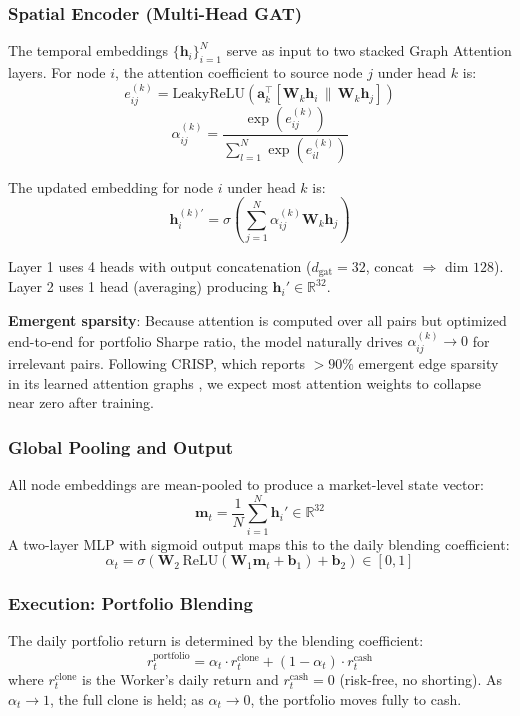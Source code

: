 \documentclass[conferences]{IEEEtran}
\begin{document}
\subsubsection{Spatial Encoder (Multi-Head GAT)}
The temporal embeddings $\{\mathbf{h}_i\}_{i=1}^{N}$ serve as input to two stacked Graph Attention layers. For node $i$, the attention coefficient to source node $j$ under head $k$ is:
\[
    e_{ij}^{(k)} = \text{LeakyReLU}\!\left( \mathbf{a}_k^\top \left[ \mathbf{W}_k \mathbf{h}_i \,\|\, \mathbf{W}_k \mathbf{h}_j \right] \right)
\]
\[
    \alpha_{ij}^{(k)} = \frac{\exp(e_{ij}^{(k)})}{\sum_{l=1}^{N} \exp(e_{il}^{(k)})}
\]

The updated embedding for node $i$ under head $k$ is:
\[
    \mathbf{h}_i^{(k)'} = \sigma\!\left( \sum_{j=1}^{N} \alpha_{ij}^{(k)} \mathbf{W}_k \mathbf{h}_j \right)
\]

Layer 1 uses 4 heads with output concatenation ($d_{\text{gat}} = 32$, concat $\Rightarrow$ dim $128$). Layer 2 uses 1 head (averaging) producing $\mathbf{h}_i' \in \mathbb{R}^{32}$.

\textbf{Emergent sparsity}: Because attention is computed over all pairs but optimized end-to-end for portfolio Sharpe ratio, the model naturally drives $\alpha_{ij}^{(k)} \to 0$ for irrelevant pairs. Following CRISP, which reports $>90\%$ emergent edge sparsity in its learned attention graphs \cite{crisp2024}, we expect most attention weights to collapse near zero after training.

\subsubsection{Global Pooling and Output}
All node embeddings are mean-pooled to produce a market-level state vector:
\[
    \mathbf{m}_t = \frac{1}{N} \sum_{i=1}^{N} \mathbf{h}_i' \in \mathbb{R}^{32}
\]
A two-layer MLP with sigmoid output maps this to the daily blending coefficient:
\[
    \alpha_t = \sigma\!\left( \mathbf{W}_2 \, \text{ReLU}(\mathbf{W}_1 \mathbf{m}_t + \mathbf{b}_1) + \mathbf{b}_2 \right) \in [0,1]
\]

\subsubsection{Execution: Portfolio Blending}
The daily portfolio return is determined by the blending coefficient:
\[
    r_t^{\text{portfolio}} = \alpha_t \cdot r_t^{\text{clone}} + (1 - \alpha_t) \cdot r_t^{\text{cash}}
\]
where $r_t^{\text{clone}}$ is the Worker's daily return and $r_t^{\text{cash}} = 0$ (risk-free, no shorting). As $\alpha_t \to 1$, the full clone is held; as $\alpha_t \to 0$, the portfolio moves fully to cash.
\end{document}
